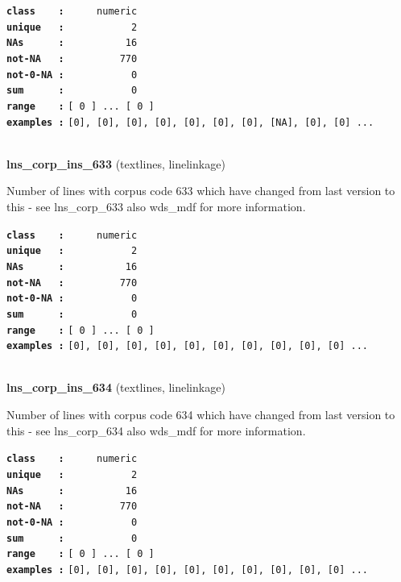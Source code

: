 \documentclass[]{article}
\begin{document}
\textbf{\texttt{class\ \ \ \ :}} \texttt{~~~~~numeric}\\
\textbf{\texttt{unique\ \ \ :}} \texttt{~~~~~~~~~~~2}\\
\textbf{\texttt{NAs\ \ \ \ \ \ :}} \texttt{~~~~~~~~~~16}\\
\textbf{\texttt{not-NA\ \ \ :}} \texttt{~~~~~~~~~770}\\
\textbf{\texttt{not-0-NA\ :}} \texttt{~~~~~~~~~~~0}\\
\textbf{\texttt{sum\ \ \ \ \ \ :}} \texttt{~~~~~~~~~~~0}\\
\textbf{\texttt{range\ \ \ \ :}}
\texttt{{[}\ 0\ {]}\ ...\ {[}\ 0\ {]}}\\
\textbf{\texttt{examples\ :}}
\texttt{{[}0{]},\ {[}0{]},\ {[}0{]},\ {[}0{]},\ {[}0{]},\ {[}0{]},\ {[}0{]},\ {[}NA{]},\ {[}0{]},\ {[}0{]}\ ...}\\

~

\textbf{lns\_corp\_ins\_633} (textlines, linelinkage)

Number of lines with corpus code 633 which have changed from last
version to this - see lns\_corp\_633 also wds\_mdf for more information.

\textbf{\texttt{class\ \ \ \ :}} \texttt{~~~~~numeric}\\
\textbf{\texttt{unique\ \ \ :}} \texttt{~~~~~~~~~~~2}\\
\textbf{\texttt{NAs\ \ \ \ \ \ :}} \texttt{~~~~~~~~~~16}\\
\textbf{\texttt{not-NA\ \ \ :}} \texttt{~~~~~~~~~770}\\
\textbf{\texttt{not-0-NA\ :}} \texttt{~~~~~~~~~~~0}\\
\textbf{\texttt{sum\ \ \ \ \ \ :}} \texttt{~~~~~~~~~~~0}\\
\textbf{\texttt{range\ \ \ \ :}}
\texttt{{[}\ 0\ {]}\ ...\ {[}\ 0\ {]}}\\
\textbf{\texttt{examples\ :}}
\texttt{{[}0{]},\ {[}0{]},\ {[}0{]},\ {[}0{]},\ {[}0{]},\ {[}0{]},\ {[}0{]},\ {[}0{]},\ {[}0{]},\ {[}0{]}\ ...}\\

~

\textbf{lns\_corp\_ins\_634} (textlines, linelinkage)

Number of lines with corpus code 634 which have changed from last
version to this - see lns\_corp\_634 also wds\_mdf for more information.

\textbf{\texttt{class\ \ \ \ :}} \texttt{~~~~~numeric}\\
\textbf{\texttt{unique\ \ \ :}} \texttt{~~~~~~~~~~~2}\\
\textbf{\texttt{NAs\ \ \ \ \ \ :}} \texttt{~~~~~~~~~~16}\\
\textbf{\texttt{not-NA\ \ \ :}} \texttt{~~~~~~~~~770}\\
\textbf{\texttt{not-0-NA\ :}} \texttt{~~~~~~~~~~~0}\\
\textbf{\texttt{sum\ \ \ \ \ \ :}} \texttt{~~~~~~~~~~~0}\\
\textbf{\texttt{range\ \ \ \ :}}
\texttt{{[}\ 0\ {]}\ ...\ {[}\ 0\ {]}}\\
\textbf{\texttt{examples\ :}}
\texttt{{[}0{]},\ {[}0{]},\ {[}0{]},\ {[}0{]},\ {[}0{]},\ {[}0{]},\ {[}0{]},\ {[}0{]},\ {[}0{]},\ {[}0{]}\ ...}\\
\end{document}
